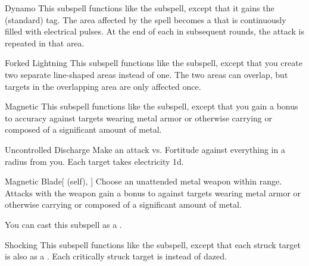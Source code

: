 \begin{ability}[\nth{2}]{Dynamo}
This subspell functions like the  subspell, except that it gains the  (standard) tag.
The area affected by the spell becomes a  that is continuously filled with electrical pulses.
At the end of each  in subsequent rounds, the attack is repeated in that area.
\end{ability}
\vspace{0.25em}


\begin{ability}[\nth{2}]{Forked Lightning}
This subspell functions like the  subspell, except that you create two separate line-shaped areas instead of one.
The two areas can overlap, but targets in the overlapping area are only affected once.
\end{ability}
\vspace{0.25em}


\begin{ability}[\nth{2}]{Magnetic}
This subspell functions like the  subspell, except that you gain a  bonus to accuracy against targets wearing metal armor or otherwise carrying or composed of a significant amount of metal.
\end{ability}
\vspace{0.25em}


\begin{ability}[\nth{2}]{Uncontrolled Discharge}
Make an attack vs. Fortitude against everything in a \areamed radius from you.
\hit Each target takes electricity  \minus1d.
\end{ability}
\vspace{0.25em}


\begin{ability}[\nth{3}]{Magnetic Blade}[ (self), ]
Choose an unattended metal weapon within \rngclose range.
Attacks with the weapon gain a  bonus to  against targets wearing metal armor or otherwise carrying or composed of a significant amount of metal.

You can cast this subspell as a .
\end{ability}
\vspace{0.25em}


\begin{ability}[\nth{3}]{Shocking}
This subspell functions like the  subspell, except that each struck target is also  as a .
Each critically struck target is  instead of dazed.
\end{ability}
\vspace{0.25em}


